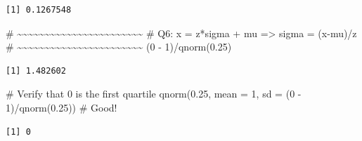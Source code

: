 \documentclass[
  letterpaper,
  DIV=11,
  numbers=noendperiod]{scrreprt}
\newenvironment{Shaded}{\begin{snugshade}}{\end{snugshade}}
\newcommand{\AttributeTok}[1]{\textcolor[rgb]{0.40,0.45,0.13}{#1}}
\newcommand{\CommentTok}[1]{\textcolor[rgb]{0.37,0.37,0.37}{#1}}
\newcommand{\DecValTok}[1]{\textcolor[rgb]{0.68,0.00,0.00}{#1}}
\newcommand{\FloatTok}[1]{\textcolor[rgb]{0.68,0.00,0.00}{#1}}
\newcommand{\FunctionTok}[1]{\textcolor[rgb]{0.28,0.35,0.67}{#1}}
\newcommand{\NormalTok}[1]{\textcolor[rgb]{0.00,0.23,0.31}{#1}}
\newcommand{\SpecialCharTok}[1]{\textcolor[rgb]{0.37,0.37,0.37}{#1}}
\begin{document}
\begin{verbatim}
[1] 0.1267548
\end{verbatim}

\begin{Shaded}
\begin{Highlighting}[]
\CommentTok{\# \textasciitilde{}\textasciitilde{}\textasciitilde{}\textasciitilde{}\textasciitilde{}\textasciitilde{}\textasciitilde{}\textasciitilde{}\textasciitilde{}\textasciitilde{}\textasciitilde{}\textasciitilde{}\textasciitilde{}\textasciitilde{}\textasciitilde{}\textasciitilde{}\textasciitilde{}\textasciitilde{}\textasciitilde{}\textasciitilde{}\textasciitilde{}\textasciitilde{}\textasciitilde{}}
\CommentTok{\# Q6: x = z*sigma + mu =\textgreater{} sigma = (x{-}mu)/z}
\CommentTok{\# \textasciitilde{}\textasciitilde{}\textasciitilde{}\textasciitilde{}\textasciitilde{}\textasciitilde{}\textasciitilde{}\textasciitilde{}\textasciitilde{}\textasciitilde{}\textasciitilde{}\textasciitilde{}\textasciitilde{}\textasciitilde{}\textasciitilde{}\textasciitilde{}\textasciitilde{}\textasciitilde{}\textasciitilde{}\textasciitilde{}\textasciitilde{}\textasciitilde{}\textasciitilde{}}
\NormalTok{(}\DecValTok{0} \SpecialCharTok{{-}} \DecValTok{1}\NormalTok{)}\SpecialCharTok{/}\FunctionTok{qnorm}\NormalTok{(}\FloatTok{0.25}\NormalTok{)}
\end{Highlighting}
\end{Shaded}

\begin{verbatim}
[1] 1.482602
\end{verbatim}

\begin{Shaded}
\begin{Highlighting}[]
\CommentTok{\# Verify that 0 is the first quartile}
\FunctionTok{qnorm}\NormalTok{(}\FloatTok{0.25}\NormalTok{, }\AttributeTok{mean =} \DecValTok{1}\NormalTok{, }\AttributeTok{sd =}\NormalTok{ (}\DecValTok{0} \SpecialCharTok{{-}} \DecValTok{1}\NormalTok{)}\SpecialCharTok{/}\FunctionTok{qnorm}\NormalTok{(}\FloatTok{0.25}\NormalTok{)) }\CommentTok{\# Good!}
\end{Highlighting}
\end{Shaded}

\begin{verbatim}
[1] 0
\end{verbatim}
\end{document}

